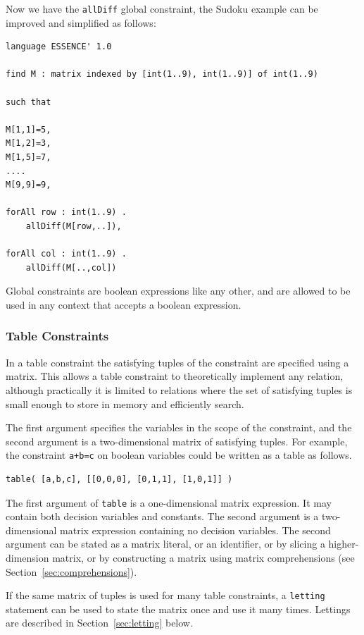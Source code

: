\documentclass[a4paper]{article}
\begin{document}
Now we have the \texttt{allDiff} global constraint, the Sudoku example can be improved
and simplified as follows:

\begin{verbatim}
language ESSENCE' 1.0

find M : matrix indexed by [int(1..9), int(1..9)] of int(1..9)

such that

M[1,1]=5,
M[1,2]=3,
M[1,5]=7,
....
M[9,9]=9,

forAll row : int(1..9) .
    allDiff(M[row,..]),

forAll col : int(1..9) .
    allDiff(M[..,col])	 
\end{verbatim}

Global constraints are boolean expressions like any other, and are allowed to be
used in any context that accepts a boolean expression. 

\subsubsection{Table Constraints}

In a table constraint the satisfying tuples of the constraint are specified using a matrix. 
This allows a table constraint to theoretically implement any relation, although
practically it is limited to relations where the set of satisfying tuples is small
enough to store in memory and efficiently search. 

The first argument specifies the variables in the scope of the
constraint, and the second argument is a two-dimensional matrix of satisfying tuples. 
For example, the constraint {\tt a+b=c} on boolean variables could be written
as a table as follows. 

\begin{verbatim}
table( [a,b,c], [[0,0,0], [0,1,1], [1,0,1]] )
\end{verbatim}

The first argument of \texttt{table} is a one-dimensional matrix expression. It
may contain both decision variables and constants. The second argument is a 
two-dimensional matrix expression containing no decision variables. The second argument
can be stated as a matrix literal, or an identifier, or by slicing a higher-dimension
matrix, or by constructing a matrix using matrix comprehensions (see Section~\ref{sec:comprehensions}). 

If the same matrix of tuples is used for many table constraints, a {\tt letting} 
statement can be used to state the matrix once and use it many times. Lettings are
described in Section~\ref{sec:letting} below. 
\end{document}
